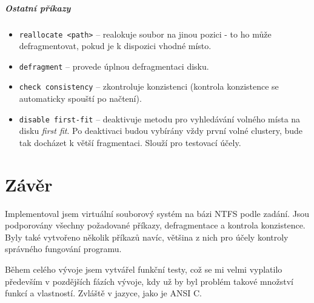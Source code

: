 \documentclass[12pt, a4paper]{report}
\begin{document}
\paragraph{Ostatní příkazy}
\begin{itemize}
	\item \verb|reallocate <path>| -- realokuje soubor na jinou pozici - to ho může defragmentovat, pokud je k dispozici vhodné místo.
	\item \verb|defragment| -- provede úplnou defragmentaci disku.
	\item \verb|check consistency| -- zkontroluje konzistenci (kontrola konzistence se automaticky spouští po načtení).
	\item \verb|disable first-fit| -- deaktivuje metodu pro vyhledávání volného místa na disku \emph{first fit}. Po deaktivaci budou vybírány vždy první volné clustery, bude tak docházet k větší fragmentaci. Slouží pro testovací účely.
\end{itemize}


\chapter{Závěr}
Implementoval jsem virtuální souborový systém na bázi NTFS podle zadání. Jsou podporovány všechny požadované příkazy, defragmentace a kontrola konzistence. Byly také vytvořeno několik příkazů navíc, většina z nich pro účely kontroly správného fungování programu.

Během celého vývoje jsem vytvářel funkční testy, což se mi velmi vyplatilo především v pozdějších fázích vývoje, kdy už by byl problém  takové množství funkcí a vlastností. Zvláště v jazyce, jako je ANSI C. 
\end{document}
